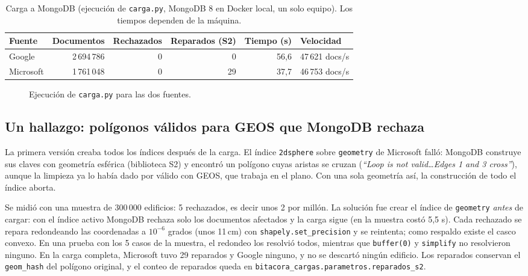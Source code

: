 \documentclass[11pt,a4paper]{article}
\newcommand{\campo}[1]{\texttt{#1}}
\begin{document}
\begin{table}[H]
\centering\small
\begin{tabularx}{\textwidth}{@{}lrrrrL@{}}
\toprule
\textbf{Fuente} & \textbf{Documentos} & \textbf{Rechazados} &
\textbf{Reparados (S2)} & \textbf{Tiempo (s)} & \textbf{Velocidad} \\
\midrule
Google    & 2\,694\,786 & 0 & 0  & 56,6 & 47\,621 docs/s \\
Microsoft & 1\,761\,048 & 0 & 29 & 37,7 & 46\,753 docs/s \\
\bottomrule
\end{tabularx}
\caption{Carga a MongoDB (ejecución de \campo{carga.py}, MongoDB
8 en Docker local, un solo equipo). Los tiempos dependen de la máquina.}
\label{tab:carga-edif}
\end{table}

\begin{figure}[H]
  \centering
  \caption{Ejecución de \campo{carga.py} para las dos fuentes.}
  \label{fig:cap-carga-edif}
\end{figure}

\subsection{Un hallazgo: polígonos válidos para GEOS que MongoDB rechaza}
\label{sec:samuel3-s2}

La primera versión creaba todos los índices después de la carga. El índice
\campo{2dsphere} sobre \campo{geometry} de Microsoft falló: MongoDB construye
sus claves con geometría esférica (biblioteca S2) y encontró un polígono cuyas
aristas se cruzan (\emph{``Loop is not valid\ldots Edges 1 and 3 cross''}),
aunque la limpieza ya lo había dado por válido con GEOS, que trabaja en el
plano. Con una sola geometría así, la construcción de todo el índice aborta.

Se midió con una muestra de 300\,000 edificios: 5 rechazados, es decir unos
2 por millón. La solución fue crear el índice de \campo{geometry} \emph{antes}
de cargar: con el índice activo MongoDB rechaza solo los documentos afectados
y la carga sigue (en la muestra costó 5,5 s). Cada rechazado se repara
redondeando las coordenadas a $10^{-6}$ grados (unos 11\,cm) con
\campo{shapely.set\_precision} y se reintenta; como respaldo existe el casco
convexo. En una prueba con los 5 casos de la muestra, el redondeo los resolvió
todos, mientras que \campo{buffer(0)} y \campo{simplify} no resolvieron
ninguno. En la carga completa, Microsoft tuvo 29 reparados y Google ninguno,
y no se descartó ningún edificio. Los reparados conservan el
\campo{geom\_hash} del polígono original, y el conteo de reparados queda en
\campo{bitacora\_cargas.parametros.reparados\_s2}.
\end{document}
